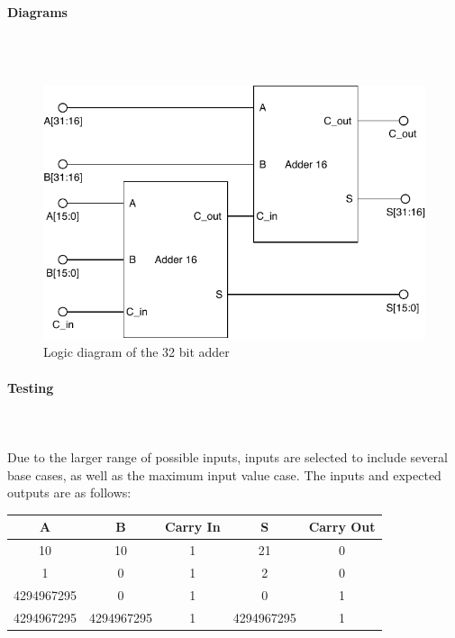 \documentclass{article}
\begin{document}
    \paragraph{Diagrams}
    \hfill\\\\
    \begin{figure}[H]
        \centering
        \includegraphics{../diagrams/alu/adder/adder_32.pdf}
        \caption{Logic diagram of the 32 bit adder}
    \end{figure}

    \paragraph{Testing}
    \hfill\\\\
    Due to the larger range of possible inputs, inputs are selected to include
    several base cases, as well as the maximum input value case. The inputs
    and expected outputs are as follows:

    \begin{center}
        \begin{tabular}{|c|c|c||c|c|}
            \hline
            A & B & Carry In & S & Carry Out
            \\\hline\hline
            10 & 10 & 1 & 21 & 0
            \\\hline
            1 & 0 & 1 & 2 & 0
            \\\hline
            4294967295 & 0 & 1 & 0 & 1
            \\\hline
            4294967295 & 4294967295 & 1 & 4294967295 & 1
            \\\hline
        \end{tabular}
    \end{center}
\end{document}
